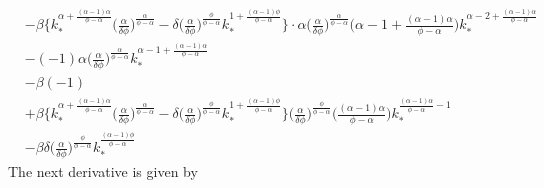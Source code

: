 \documentclass[a4paper]{article}
\theoremstyle{definition}
\begin{document}
\begin{align*}
												&- \beta \Big\{ k_{*}^{\alpha+\frac{(\alpha-1)\alpha}{\phi-\alpha}} \Big( \frac{\alpha}{\delta\phi} \Big)^{\frac{\alpha}{\phi-\alpha}} - \delta \Big( \frac{\alpha}{\delta\phi} \Big)^{\frac{\phi}{\phi-\alpha}}k_{*}^{1+\frac{(\alpha-1)\phi}{\phi-\alpha}} \Big\} \cdot \alpha \Big( \frac{\alpha}{\delta\phi} \Big)^{\frac{\alpha}{\phi-\alpha}}\Big( \alpha-1+\frac{(\alpha-1)\alpha}{\phi-\alpha} \Big)k_{*}^{\alpha-2+\frac{(\alpha-1)\alpha}{\phi-\alpha}} \\ 
												&- (-1)\alpha \Big( \frac{\alpha}{\delta\phi} \Big)^{\frac{\alpha}{\phi-\alpha}} k_{*}^{\alpha-1+\frac{(\alpha-1)\alpha}{\phi-\alpha}} \\
												&- \beta (-1) \\
												&+ \beta \Big\{ k_{*}^{\alpha+\frac{(\alpha-1)\alpha}{\phi-\alpha}} \Big( \frac{\alpha}{\delta\phi} \Big)^{\frac{\alpha}{\phi-\alpha}} - \delta \Big( \frac{\alpha}{\delta\phi} \Big)^{\frac{\phi}{\phi-\alpha}} k_{*}^{1+\frac{(\alpha-1)\phi}{\phi-\alpha}} \Big\}  \Big( \frac{\alpha}{\delta\phi} \Big)^{\frac{\phi}{\phi-\alpha}} \Big( \frac{(\alpha-1)\alpha}{\phi-\alpha} \Big)k_{*}^{\frac{(\alpha-1)\alpha}{\phi-\alpha}-1} \\
												&- \beta \delta \Big( \frac{\alpha}{\delta\phi} \Big)^{\frac{\phi}{\phi-\alpha}}k_{*}^{\frac{(\alpha-1)\phi}{\phi-\alpha}}
	\end{align*}
The next derivative is given by
\end{document}
